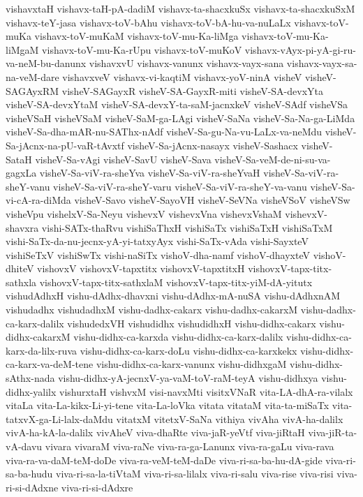 {vishavxtaH
vishavx-taH-pA-dadiM
vishavx-ta-shacxkuSx
vishavx-ta-shacxkuSxM
vishavx-teY-jasa
vishavx-toV-bAhu
vishavx-toV-bA-hu-va-nuLaLx
vishavx-toV-muKa
vishavx-toV-muKaM
vishavx-toV-mu-Ka-liMga
vishavx-toV-mu-Ka-liMgaM
vishavx-toV-mu-Ka-rUpu
vishavx-toV-muKoV
vishavx-vAyx-pi-yA-gi-ru-va-neM-bu-danunx
vishavxvU
vishavx-vanunx
vishavx-vayx-sana
vishavx-vayx-sa-na-veM-dare
vishavxveV
vishavx-vi-kaqtiM
vishavx-yoV-ninA
visheV
visheV-SAGAyxRM
visheV-SAGayxR
visheV-SA-GayxR-miti
visheV-SA-devxYta
visheV-SA-devxYtaM
visheV-SA-devxY-ta-saM-jacnxkeV
visheV-SAdf
visheVSa
visheVSaH
visheVSaM
visheV-SaM-ga-LAgi
visheV-SaNa
visheV-Sa-Na-ga-LiMda
visheV-Sa-dha-mAR-nu-SAThx-nAdf
visheV-Sa-gu-Na-vu-LaLx-va-neMdu
visheV-Sa-jAcnx-na-pU-vaR-tAvxtf
visheV-Sa-jAcnx-nasayx
visheV-Sashacx
visheV-SataH
visheV-Sa-vAgi
visheV-SavU
visheV-Sava
visheV-Sa-veM-de-ni-su-va-gagxLa
visheV-Sa-viV-ra-sheYva
visheV-Sa-viV-ra-sheYvaH
visheV-Sa-viV-ra-sheY-vanu
visheV-Sa-viV-ra-sheY-varu
visheV-Sa-viV-ra-sheY-va-vanu
visheV-Sa-vi-cA-ra-diMda
visheV-Savo
visheV-SayoVH
visheV-SeVNa
visheVSoV
visheVSw
visheVpu
vishelxV-Sa-Neyu
vishevxV
vishevxVna
vishevxVshaM
vishevxV-shavxra
vishi-SATx-thaRvu
vishiSaThxH
vishiSaTx
vishiSaTxH
vishiSaTxM
vishi-SaTx-da-nu-jecnx-yA-yi-tatxyAyx
vishi-SaTx-vAda
vishi-SayxteV
vishiSeTxV
vishiSwTx
vishi-naSiTx
vishoV-dha-namf
vishoV-dhayxteV
vishoV-dhiteV
vishovxV
vishovxV-tapxtitx
vishovxV-tapxtitxH
vishovxV-tapx-titx-sathxla
vishovxV-tapx-titx-sathxlaM
vishovxV-tapx-titx-yiM-dA-yitutx
vishudAdhxH
vishu-dAdhx-dhavxni
vishu-dAdhx-mA-nuSA
vishu-dAdhxnAM
vishudadhx
vishudadhxM
vishu-dadhx-cakarx
vishu-dadhx-cakarxM
vishu-dadhx-ca-karx-dalilx
vishudedxVH
vishudidhx
vishudidhxH
vishu-didhx-cakarx
vishu-didhx-cakarxM
vishu-didhx-ca-karxda
vishu-didhx-ca-karx-dalilx
vishu-didhx-ca-karx-da-lilx-ruva
vishu-didhx-ca-karx-doLu
vishu-didhx-ca-karxkekx
vishu-didhx-ca-karx-va-deM-tene
vishu-didhx-ca-karx-vanunx
vishu-didhxgaM
vishu-didhx-sAthx-nada
vishu-didhx-yA-jecnxV-ya-vaM-toV-raM-teyA
vishu-didhxya
vishu-didhx-yalilx
vishurxtaH
vishvxM
visi-navxMti
visitxVNaR
vita-LA-dhA-ra-vilalx
vitaLa
vita-La-kikx-Li-yi-tene
vita-La-loVka
vitata
vitataM
vita-ta-miSaTx
vita-tatxvX-ga-Li-lalx-daMdu
vitatxM
vitetxV-SaNa
vithiya
vivAha
vivA-ha-dalilx
vivA-ha-kA-la-dalilx
vivAheV
viva-dhaRte
viva-jaR-yeVtf
viva-jiRtaH
viva-jiR-ta-vA-davu
vivara
vivaraM
viva-raNe
viva-ra-ga-Lanunx
viva-ra-gaLu
viva-rava
viva-ra-va-daM-teM-doDe
viva-ra-veM-teM-daDe
viva-ri-sa-ba-hu-dA-gide
viva-ri-sa-ba-hudu
viva-ri-sa-la-tiVtaM
viva-ri-sa-lilalx
viva-ri-salu
viva-rise
viva-risi
viva-ri-si-dAdxne
viva-ri-si-dAdxre
}
